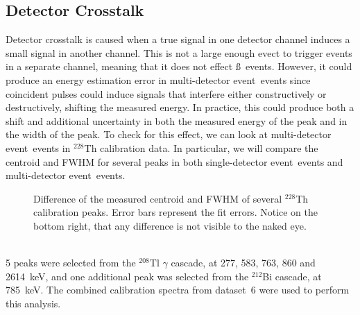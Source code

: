 \documentclass[notitlepage,rmp,aps,10pt]{revtex4-1}
\newcommand{\iso}[2]{$^{#1}$#2}
\newcommand{\Th}[1]{\iso{#1}{Th}}
\newcommand{\Tl}[1]{\iso{#1}{Tl}}
\newcommand{\Bi}[1]{\iso{#1}{Bi}}
\newcommand{\sd}{single-detector event}
\newcommand{\md}{multi-detector event}
\begin{document}
\subsection{Detector Crosstalk}
Detector crosstalk is caused when a true signal in one detector channel induces a small signal in another channel.
This is not a large enough evect to trigger events in a separate channel, meaning that it does not effect \ss\ events.
However, it could produce an energy estimation error in \md\ events since coincident pulses could induce signals that interfere either constructively or destructively, shifting the measured energy.
In practice, this could produce both a shift and additional uncertainty in both the measured energy of the peak and in the width of the peak.
To check for this effect, we can look at \md\ events in \Th{228} calibration data.
In particular, we will compare the centroid and FWHM for several peaks in both \sd\ events and \md\ events.
\begin{figure}[h]
  \centering
  \caption[Peak shape comparison for single- and multi-detector events]{\label{fig:xtalk}
    Difference of the measured centroid and FWHM of several \Th{228} calibration peaks. Error bars represent the fit errors. Notice on the bottom right, that any difference is not visible to the naked eye.
  }
\end{figure}
\\
5 peaks were selected from the \Tl{208} $\gamma$ cascade, at 277, 583, 763, 860 and 2614~keV, and one additional peak was selected from the \Bi{212} cascade, at 785~keV.
The combined calibration spectra from dataset~6 were used to perform this analysis.
\end{document}

